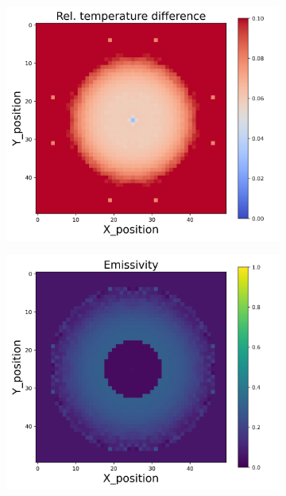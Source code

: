 \begin{figure}[htbp]
\begin{minipage}{\textwidth}
\begin{subfigure}{0.325\textwidth}
        \end{subfigure}
        \begin{subfigure}{0.325\textwidth}
            \centering
            \includegraphics[width=\textwidth]{figures/raw_data/21/mix/T_bias.jpg}
        \end{subfigure}
        \begin{subfigure}{0.325\textwidth}
            \centering
            \includegraphics[width=\textwidth]{figures/raw_data/21/mix/emi_cal.jpg}

\end{subfigure}
\end{minipage}
\end{figure}

